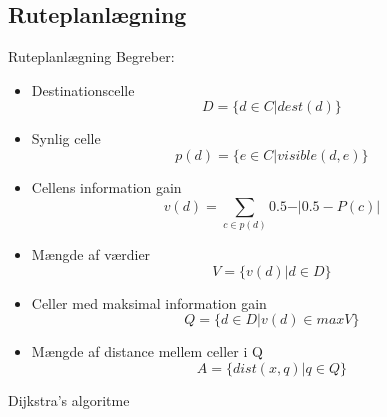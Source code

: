 \subsection{Ruteplanlægning}

\begin{frame}{Ruteplanlægning}
Begreber:
\begin{itemize}
\item Destinationscelle
$$D = \{d \in C \vert dest(d) \}$$
\item Synlig celle
$$p(d) = \{e \in C \vert visible(d,e) \}$$
\item Cellens information gain
$$v(d) = \sum_{c \in p(d)}{0.5- \vert 0.5 - P(c) \vert}$$
\end{itemize}

\end{frame}


\begin{frame}

\begin{itemize}
\item Mængde af værdier
$$V = \{v(d) \vert d \in D \}$$
\item Celler med maksimal information gain
$$Q = \{ d \in D \vert v(d) \in maxV \}$$
\item Mængde af distance mellem celler i Q
$$A = \{dist(x,q) \vert q \in Q \}$$
\end{itemize}

\end{frame}

\begin{frame}{Dijkstra's algoritme}

\end{frame}
